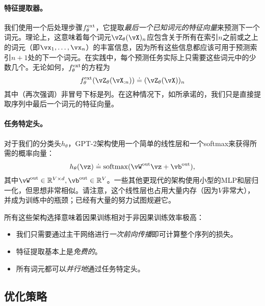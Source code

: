 \documentclass[../../book-main.tex]{subfiles}
\begin{document}
\paragraph{特征提取器。} 我们使用一个后处理步骤\(f_{\theta}^{\mathrm{ext}}\)，它提取\textit{最后一个已知词元的特征向量}来预测下一个词元。理论上，这意味着每个词元\(\vZ_{\theta}(\vX)_{n}\)应包含关于所有在索引\(n\)之前或之上的词元（即\(\vx_{1}, \dots, \vx_{n}\)）的丰富信息，因为所有这些信息都应该可用于预测索引\(n + 1\)处的下一个词元。在实践中，每个预测任务实际上只需要这些词元中的少数几个。无论如何，\(f_{\theta}^{\mathrm{ext}}\)的方程为
\begin{equation}
    f_{\theta}^{\ext}(\vZ_{\theta}(\vX_{:n})) \doteq (\vZ_{\theta}(\vX))_{n}
\end{equation}
其中（再次强调）非冒号下标是列。在这种情况下，如所承诺的，我们只是直接提取序列中最后一个词元的特征向量。

\paragraph{任务特定头。} 对于我们的分类头\(h_{\theta}\)，GPT-2架构使用一个简单的线性层和一个softmax来获得所需的概率向量：
\begin{equation}
    h_{\theta}(\vz) \doteq \softmax(\vW^{\out}\vz + \vb^{\out}),
\end{equation}
其中\(\vW^{\out} \in \R^{V \times d}, \vb^{\out} \in \R^{V}\)。一些其他更现代的架构使用小型的MLP和层归一化，但思想非常相似。请注意，这个线性层也占用大量内存（因为\(V\)非常大），并成为训练中的瓶颈；已经有大量的努力试图规避它。

所有这些架构选择意味着因果训练相对于非因果训练效率极高：
\begin{itemize}
    \item 我们只需要通过主干网络进行\textit{一次前向传播}即可计算整个序列的损失。
    \item 特征提取基本上是\textit{免费的}。
    \item 所有词元都可以\textit{并行地}通过任务特定头。
\end{itemize}

\subsection{优化策略}
\end{document}
